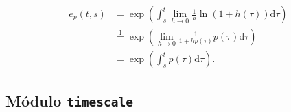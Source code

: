 \begin{frame}
	\begin{align*}
	e_{p}\left(t,s\right)
	&=\exp\left(\int_{s}^{t}\lim\limits_{h\to0}\frac{1}{h}\ln\left(1+h\left(\tau\right)\right)\mathrm{d}\tau\right)\\
	&\stackrel{\operatorname{l}}{=}\exp\left(\lim\limits_{h\to0}\frac{1}{1+hp\left(\tau\right)}p\left(\tau\right)\mathrm{d}\tau\right)\\
	&=\exp\left(\int_{s}^{t}p\left(\tau\right)\mathrm{d}\tau\right).
	\end{align*}
\end{frame}

\subsection{Módulo \texttt{timescale}}

{
	\begin{frame}[plain]
	\end{frame}
}